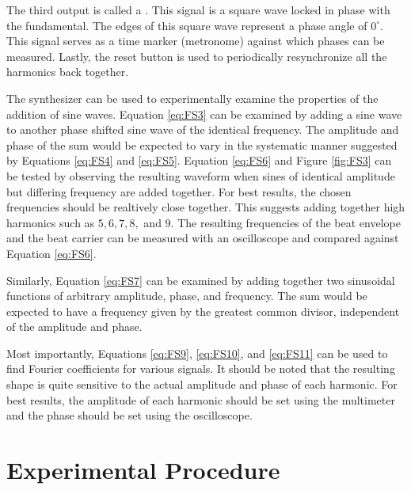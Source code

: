 \documentclass[12pt, a4paper, oneside, openright, titlepage]{book}
\begin{document}
\noindent The third output is called a . This signal is a square wave locked in phase with the fundamental. The edges of this square wave represent a phase angle of $0^{\circ}$. This signal serves as a time marker (metronome) against which phases can be measured. Lastly, the reset button is used to periodically resynchronize all the harmonics back together.

\noindent The synthesizer can be used to experimentally examine the properties of the addition of sine waves. Equation \ref{eq:FS3} can be examined by adding a sine wave to another phase shifted sine wave of the identical frequency. The amplitude and phase of the sum would be expected to vary in the systematic manner suggested by Equations \ref{eq:FS4} and \ref{eq:FS5}. Equation \ref{eq:FS6} and Figure \ref{fig:FS3} can be tested by observing the resulting waveform when sines of identical amplitude but differing frequency are added together. For best results, the chosen frequencies should be realtively close together. This suggests adding together high harmonics such as $5,6,7,8,$ and $9$. The resulting frequencies of the beat envelope and the beat carrier can be measured with an oscilloscope and compared against Equation \ref{eq:FS6}.

\noindent Similarly, Equation \ref{eq:FS7} can be examined by adding together two sinusoidal functions of arbitrary amplitude, phase, and frequency. The sum would be expected to have a frequency given by the greatest common divisor, independent of the amplitude and phase.

\noindent Most importantly, Equations \ref{eq:FS9}, \ref{eq:FS10}, and \ref{eq:FS11} can be used to find Fourier coefficients for various signals. It should be noted that the resulting shape is quite sensitive to the actual amplitude and phase of each harmonic. For best results, the amplitude of each harmonic should be set using the multimeter and the phase should be set using the oscilloscope.

\section{Experimental Procedure}
\end{document}
